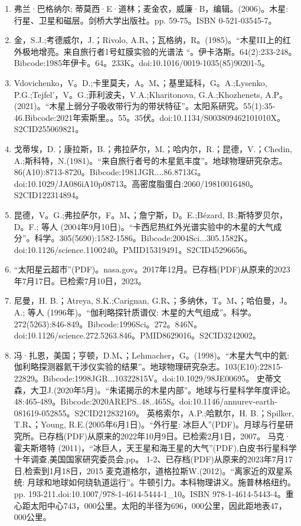 \begin{enumerate}
\item 弗兰·巴格纳尔; 蒂莫西·E·道林；麦金农，威廉·B，编辑。(2006)。木星: 行星、卫星和磁层。剑桥大学出版社。pp. 59-75。ISBN 0-521-03545-7。
\item 金，S.J.;考德威尔，J.；Rivolo, A.R、；瓦格纳，R。(1985)。“木星III上的红外极地增亮。来自旅行者1号虹膜实验的光谱法 “。伊卡洛斯。64(2):233-248。Bibcode:1985年伊卡。64。233K。doi:10.1016/0019-1035(85)90201-5。
\item Vdovichenko，V。D.;卡里莫夫，A。M、；基里延科，G。A.;Lysenko, P.G.;Tejfel'，V。G.;菲利波夫，V.A.;Kharitonova, G.A.;Khozhenets, A.P。(2021)。“木星上弱分子吸收带行为的带状特征”。太阳系研究。55(1):35-46.Bibcode:2021年索斯里。。55。35伏。doi:10.1134/S003809462101010X。S2CID255069821。 
\item 戈蒂埃，D.；康拉斯，B.；弗拉萨尔，M.；哈内尔，R.；昆德，V.；Chedin, A.;斯科特，N.(1981)。“来自旅行者号的木星氦丰度”。地球物理研究杂志。86(A10):8713-8720。Bibcode:1981JGR....86.8713G。doi:10.1029/JA086iA10p08713。高密度脂蛋白:2060/19810016480。S2CID122314894。 
\item 昆德，V。G.;弗拉萨尔，F。M、；詹宁斯，D。E.;Bézard, B.;斯特罗贝尔，D。F.; 等人 (2004年9月10日)。“卡西尼热红外光谱实验中的木星的大气成分”。科学。305(5690):1582-1586。Bibcode:2004Sci...305.1582K。doi:10.1126/science.1100240。PMID15319491。S2CID45296656。  
\item “太阳星云超市”(PDF)。nasa.gov。2017年12月。已存档(PDF)从原来的2023年7月17日。已检索7月10日，2023。
\item 尼曼，H. B.；Atreya, S.K.;Carignan, G.R、；多纳休，T。M、；哈伯曼，J。A.; 等人 (1996年)。“伽利略探针质谱仪: 木星的大气组成”。科学。272(5263):846-849。Bibcode:1996Sci。272。846N。doi:10.1126/science.272.5263.846。PMID8629016。S2CID3242002。  
\item 冯·扎恩，美国；亨顿，D.M、；Lehmacher，G。(1998)。“木星大气中的氦: 伽利略探测器氦干涉仪实验的结果”。地球物理研究杂志。103(E10):22815-22829。Bibcode:1998JGR...10322815V。doi:10.1029/98JE00695。
 史蒂文森，大卫J.(2020年5月)。“朱诺揭示的木星内部”。地球与行星科学年度评论。48:465-489。Bibcode:2020AREPS..48..465S。doi:10.1146/annurev-earth-081619-052855。S2CID212832169。 
 英格索尔，A.P.;哈默尔，H. B.；Spilker, T.R、；Young, R.E.(2005年6月1日)。“外行星: 冰巨人”(PDF)。月球与行星研究所。已存档(PDF)从原来的2022年10月9日。已检索2月1日，2007。
 马克·霍夫斯塔特 (2011)，“冰巨人，天王星和海王星的大气”(PDF),白皮书行星科学十年调查,美国国家研究委员会,pp。 1-2、已存档(PDF)从原来的2023年7月17日,检索到1月18日，2015
 麦克道格尔，道格拉斯W.(2012)。“离家近的双星系统: 月球和地球如何绕轨道运行”。牛顿引力。本科物理讲义。施普林格纽约。pp. 193-211.doi:10.1007/978-1-4614-5444-1_10。ISBN 978-1-4614-5443-4。重心距太阳中心743，000公里。太阳的半径为696，000公里，因此距地表47，000公里。

\end{enumerate}
